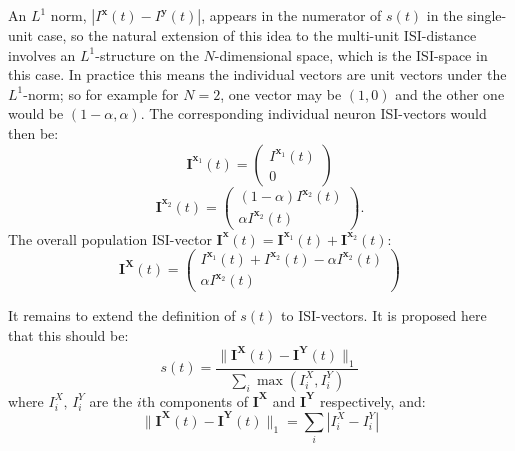 \documentclass[12pt]{amsart}
\begin{document}
An $L^1$ norm, $| I^{\mathbf{x}}(t) - I^{\mathbf{y}}(t) | $, appears in the numerator of $s(t)$ in the single-unit case, so the natural extension of this idea to the multi-unit ISI-distance involves an $L^1$-structure on the $N$-dimensional space, which is the ISI-space in this case. In practice this means the individual vectors are unit vectors under the $L^1$-norm; so for example for $N=2$, one vector may be $(1,0)$ and the other one would be $(1-\alpha,\alpha)$.  The corresponding individual neuron ISI-vectors would then be: 
\begin{equation}
\mathbf{I}^{\mathbf{x}_1}(t)=\begin{pmatrix}I^{\mathbf{x}_1}(t)\\0\end{pmatrix}
\end{equation}
\begin{equation}
\mathbf{I}^{\mathbf{x}_2}(t) = \begin{pmatrix} (1-\alpha)I^{\mathbf{x}_2}(t)\\ \alpha I^{\mathbf{x}_2}(t)\end{pmatrix}.
\end{equation}
The overall population ISI-vector $\mathbf{I^x}(t) = \mathbf{I}^{\mathbf{x}_1}(t) + \mathbf{I}^{\mathbf{x}_2}(t)$:
\begin{equation}
\mathbf{I^X}(t) = \begin{pmatrix} I^{\mathbf{x}_1}(t) + I^{\mathbf{x}_2}(t) - \alpha I^{\mathbf{x}_2}(t) \\ \alpha I^{\mathbf{x}_2}(t) \end{pmatrix}
\end{equation}

It remains to extend the definition of $s(t)$ to ISI-vectors. It is proposed here that this should be:
\begin{equation}
s(t) = \frac{ \| \mathbf{I^X}(t) - \mathbf{I^Y}(t) \|_1 }{ \sum_i \max ( I^X_i, I^Y_i ) }
\end{equation}
where $I^X_i, \, I^Y_i$ are the $i$th components of $\mathbf{I^X}$ and $\mathbf{I^Y}$ respectively, and:
\begin{equation}
\| \mathbf{I^X}(t) - \mathbf{I^Y}(t) \|_1 = \sum_i | I^X_i - I^Y_i |
\end{equation}
\end{document}
